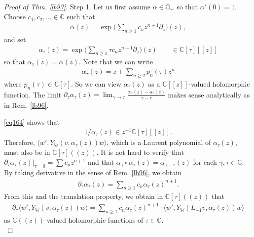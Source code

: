 \documentclass[12pt,a4paper,notitlepage]{article}
\theoremstyle{definition}
\theoremstyle{plain}
\newcommand{\bk}[1]{\langle {#1}\rangle}
\newcommand{\Wbb}{\mathbb W}
\newcommand{\Gbb}{\mathbb G}
\newcommand{\Cbb}{\mathbb C}
\numberwithin{equation}{section}
\begin{document}
\begin{proof}[Proof of Thm. \ref{lb93}]
Step 1. Let us first assume $\alpha\in\Gbb_+$ so that $\alpha'(0)=1$. Choose $c_1,c_2,\dots\in\Cbb$ such that
\begin{align}
	\alpha(z)=\exp\Big(\sum_{n\geq 1} c_nz^{n+1}\partial_z\Big)(z),\label{eq172}	
\end{align}
and set
\begin{align*}
	\alpha_\tau(z)=\exp\Big(\sum_{n\geq 1}\tau c_nz^{n+1}\partial_z\Big)(z)	\qquad\in\Cbb[\tau][[z]]
\end{align*}
so that $\alpha_1(z)=\alpha(z)$. Note that we can write
\begin{align}
	\alpha_\tau(z)=z+\sum_{n\geq 2}p_n(\tau)z^n	\label{eq164}
\end{align}
where $p_n(\tau)\in\Cbb[\tau]$. So we can view $\alpha_\tau(z)$ as a $\Cbb[[z]]$-valued holomorphic function. The limit $\partial_\tau\alpha_\tau(z)=\lim_{\gamma\rightarrow\tau}\frac{\alpha_\gamma(z)-\alpha_\tau(z)}{\gamma-\tau}$ makes sense analytically as in Rem. \ref{lb96}.

\eqref{eq164} shows that
\begin{align*}
	1/\alpha_\tau(z)\in z^{-1}\Cbb[\tau][[z]].
\end{align*}
Therefore, $\bk{w',Y_\Wbb(v,\alpha_\tau(z))w}$, which is a Laurent polynomial of $\alpha_\tau(z)$, must also be in $\Cbb[\tau]((z))$. It is not hard to verify that $\partial_\tau  \alpha_\tau(z)|_{\tau=0}=\sum c_nz^{n+1}$ and that  $\alpha_\gamma\circ\alpha_\tau(z)=\alpha_{\gamma+\tau}(z)$ for each $\gamma,\tau\in\Cbb$. By taking derivative in the sense of Rem. \ref{lb96}, we obtain
\begin{align*}
	\partial_\tau\alpha_\tau(z)=\sum_{n\geq 1}c_n\alpha_\tau(z)^{n+1}.	
\end{align*}
From this and the translation property, we obtain in $\Cbb[\tau]((z))$ that
\begin{align}
	\partial_\tau\bk{w',Y_\Wbb(v,\alpha_\tau(z))w}=\sum_{n\geq 1}c_n\alpha_\tau(z)^{n+1}\cdot \bk{w',Y_\Wbb(L_{-1}v,\alpha_\tau(z))w}\label{eq173}
\end{align}
as $\Cbb((z))$-valued holomorphic functions of $\tau\in\Cbb$.  \\


\end{proof}
\end{document}
